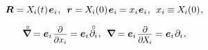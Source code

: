 \nopagebreak\vspace{-0.2em}\begin{equation*}
\bm{R} = \hspace{-0.15ex} X_{\hspace{-0.1ex}i}(t) \hspace{.2ex} \bm{e}_i
\hspace{.1ex} , \:\;
\bm{r} = \hspace{-0.15ex} X_{\hspace{-0.1ex}i}(0) \hspace{.2ex} \bm{e}_i \hspace{-0.16ex} = x_i \hspace{.1ex} \bm{e}_i
\hspace{.1ex} , \:\:
x_i \hspace{-0.1ex} \equiv \hspace{-0.1ex} X_{\hspace{-0.1ex}i}(0)
\hspace{.1ex} ,
\end{equation*}

\nopagebreak\vspace{-0.25em}\begin{equation*}
\boldnablacircled \hspace{-0.1ex}
= \bm{e}_i \hspace{.2ex} \scalebox{0.9}{$ \displaystyle \frac{\raisemath{-0.2em}{\partial}}{\partial x_i} $} \hspace{-0.1ex}
= \bm{e}_i \hspace{.15ex} \mathcircabove{\partial}_i
\hspace{.1ex} , \:\:
%
\boldnabla \hspace{-0.1ex}
= \bm{e}_i \hspace{.2ex} \scalebox{0.9}{$ \displaystyle \frac{\raisemath{-0.2em}{\partial}}{\partial \hspace{-0.2ex} X_{\hspace{-0.1ex}i}} $} \hspace{-0.1ex}
= \bm{e}_i \hspace{.15ex} \partial_i
\hspace{.1ex} ,
\end{equation*}

